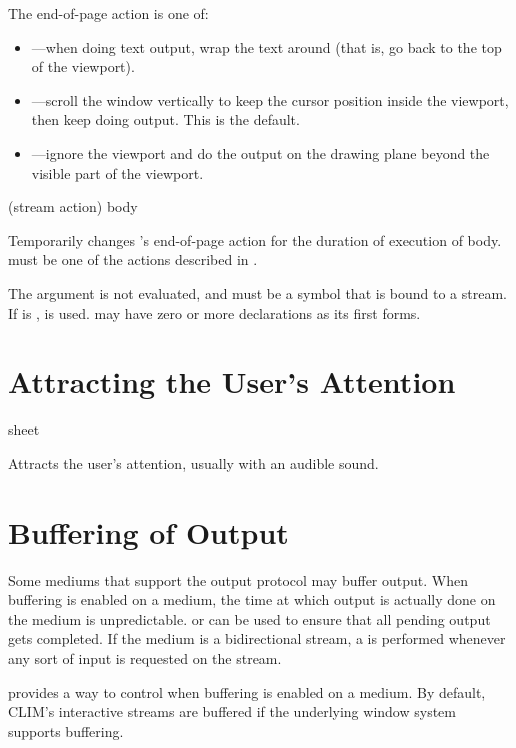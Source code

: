 The end-of-page action is one of: 

\begin{itemize}
\item {}---when doing text output, wrap the text around (that is, go back
to the top of the viewport).

\item {}---scroll the window vertically to keep the cursor position
inside the viewport, then keep doing output.  This is the default.

\item {}---ignore the viewport and do the output on the drawing plane
beyond the visible part of the viewport.
\end{itemize}

 {(stream action) \body body}

Temporarily changes 's end-of-page action for the duration of
execution of body.   must be one of the actions described in
.

The  argument is not evaluated, and must be a symbol that is bound
to a stream.  If  is ,  is used.
 may have zero or more declarations as its first forms.


\section {Attracting the User's Attention}

 {\optional sheet}

Attracts the user's attention, usually with an audible sound.


\section {Buffering of Output}

Some mediums that support the output protocol may buffer output.  When buffering
is enabled on a medium, the time at which output is actually done on the medium
is unpredictable.   or  can be used to ensure
that all pending output gets completed.  If the medium is a bidirectional
stream, a  is performed whenever any sort of input is requested
on the stream.

 provides a way to control when buffering is enabled on
a medium.  By default, CLIM's interactive streams are buffered if the underlying
window system supports buffering.


